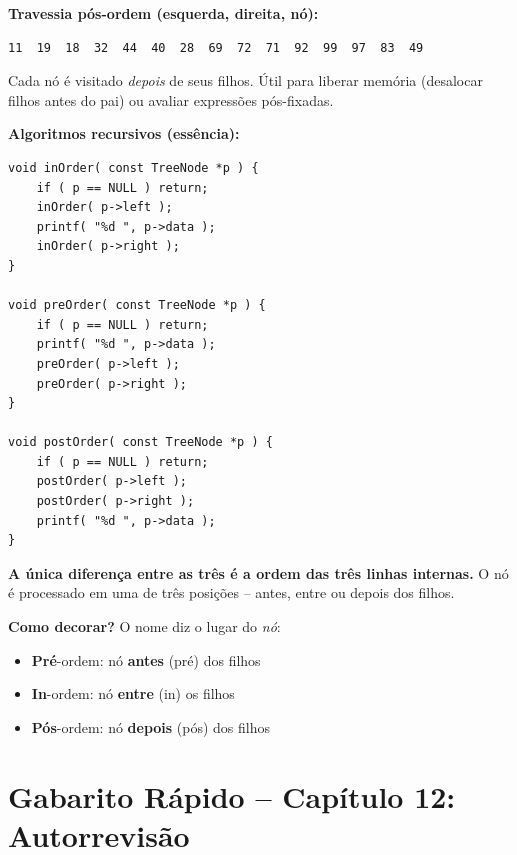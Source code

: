 \documentclass[12pt,a4paper]{article}
\begin{document}
\begin{respostabox}
\textbf{Travessia pós-ordem (esquerda, direita, nó):}
\begin{lstlisting}
11  19  18  32  44  40  28  69  72  71  92  99  97  83  49
\end{lstlisting}

Cada nó é visitado \textit{depois} de seus filhos. Útil para liberar memória
(desalocar filhos antes do pai) ou avaliar expressões pós-fixadas.

\bigskip

\textbf{Algoritmos recursivos (essência):}
\begin{lstlisting}
void inOrder( const TreeNode *p ) {
    if ( p == NULL ) return;
    inOrder( p->left );
    printf( "%d ", p->data );
    inOrder( p->right );
}

void preOrder( const TreeNode *p ) {
    if ( p == NULL ) return;
    printf( "%d ", p->data );
    preOrder( p->left );
    preOrder( p->right );
}

void postOrder( const TreeNode *p ) {
    if ( p == NULL ) return;
    postOrder( p->left );
    postOrder( p->right );
    printf( "%d ", p->data );
}
\end{lstlisting}

\textbf{A única diferença entre as três é a ordem das três linhas internas.} O
nó é processado em uma de três posições -- antes, entre ou depois dos filhos.

\begin{boaprática}
  \textbf{Como decorar?} O nome diz o lugar do \textit{nó}:
  \begin{itemize}[noitemsep]
    \item \textbf{Pré}-ordem: nó \textbf{antes} (pré) dos filhos
    \item \textbf{In}-ordem: nó \textbf{entre} (in) os filhos
    \item \textbf{Pós}-ordem: nó \textbf{depois} (pós) dos filhos
  \end{itemize}
\end{boaprática}
\end{respostabox}

\newpage

\section*{Gabarito Rápido -- Capítulo 12: Autorrevisão}
\end{document}
